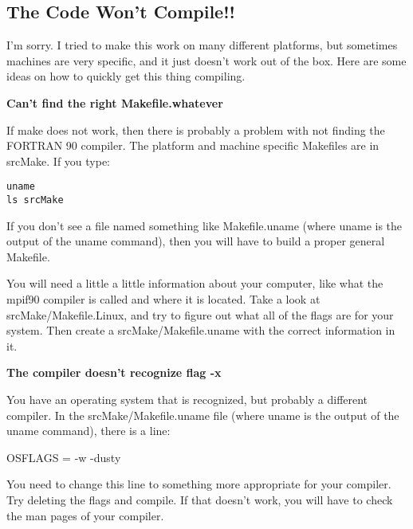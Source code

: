 \subsection{The Code Won't Compile!!}
I’m sorry. I tried to make this work on many different platforms, but
sometimes machines are very specific, and it just doesn't work out of
the box. Here are some ideas on how to quickly get this thing
compiling.

\noindent
{\bf Can't find the right Makefile.whatever}

If make does not work, then there is probably a problem with not
finding the FORTRAN 90 compiler. The platform and machine specific
Makefiles are in srcMake. If you type:
\begin{verbatim}
uname 
ls srcMake
\end{verbatim}

If you don't see a file named something like Makefile.uname (where
uname is the output of the uname command), then you will have to build
a proper general Makefile.

You will need a little a little information about your computer, like
what the mpif90 compiler is called and where it is located. Take a
look at srcMake/Makefile.Linux, and try to figure out what all of the
flags are for your system. Then create a srcMake/Makefile.uname with
the correct information in it.

\noindent
{\bf The compiler doesn't recognize flag -x}

You have an operating system that is recognized, but probably a
different compiler. In the srcMake/Makefile.uname file (where uname is
the output of the uname command), there is a line:

OSFLAGS	= -w -dusty

You need to change this line to something more appropriate for your
compiler. Try deleting the flags and compile. If that doesn't work,
you will have to check the man pages of your compiler.

